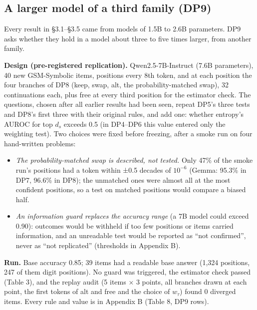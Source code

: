 \documentclass[
  10pt,
  a4paper,
]{article}
\providecommand{\tightlist}{%
  \setlength{\itemsep}{0pt}\setlength{\parskip}{0pt}}
\begin{document}
\hypertarget{a-larger-model-of-a-third-family-dp9}{%
\subsection{A larger model of a third family (DP9)}\label{a-larger-model-of-a-third-family-dp9}}

Every result in §3.1--§3.5 came from models of 1.5B to 2.6B parameters. DP9 asks whether they hold in a model about three to five times larger, from another family.

\textbf{Design (pre-registered replication).} Qwen2.5-7B-Instruct (7.6B parameters), 40 new GSM-Symbolic items, positions every 8th token, and at each position the four branches of DP8 (keep, swap,
alt, the probability-matched swap), 32 continuations each, plus free at every third position for the estimator check. The questions, chosen after all earlier results had been seen, repeat DP5's three
tests and DP8's first three with their original rules, and add one: whether entropy's AUROC for top \(d_{s}\) exceeds 0.5 (in DP4--DP6 this value entered only the weighting test). Two choices were
fixed before freezing, after a smoke run on four hand-written problems:

\begin{itemize}
\tightlist
\item
  \emph{The probability-matched swap is described, not tested.} Only 47\% of the smoke run's positions had a token within ±0.5 decades of \(10^{-6}\) (Gemma: 95.3\% in DP7, 96.6\% in DP8); the
  unmatched ones were almost all at the most confident positions, so a test on matched positions would compare a biased half.
\item
  \emph{An information guard replaces the accuracy range} (a 7B model could exceed 0.90): outcomes would be withheld if too few positions or items carried information, and an unreadable test would be
  reported as ``not confirmed'', never as ``not replicated'' (thresholds in Appendix B).
\end{itemize}

\textbf{Run.} Base accuracy 0.85; 39 items had a readable base answer (1,324 positions, 247 of them digit positions). No guard was triggered, the estimator check passed (Table 3), and the replay audit
(5 items × 3 points, all branches drawn at each point, the first tokens of alt and free and the choice of \(w_{\tau}\)) found 0 diverged items. Every rule and value is in Appendix B (Table 8, DP9
rows).
\end{document}
